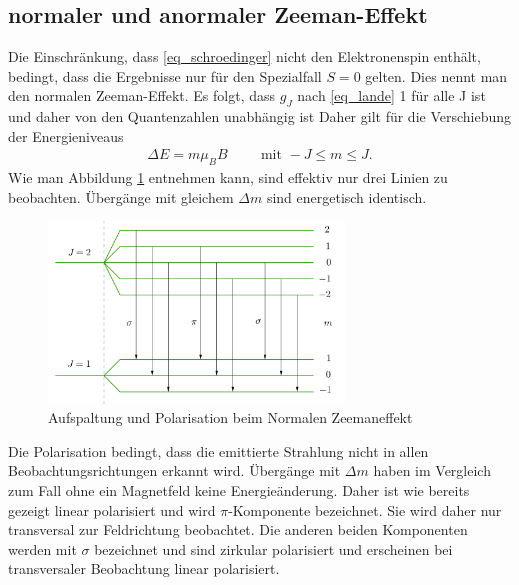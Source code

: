 \subsection{normaler und anormaler Zeeman-Effekt}                  
Die Einschränkung, dass \eqref{eq_schroedinger} nicht den Elektronenspin enthält, bedingt, dass die Ergebnisse nur für den Spezialfall $S=0$ gelten.
Dies nennt man den normalen Zeeman-Effekt. Es folgt, dass $g_J$ nach \eqref{eq_lande} 1 für alle J ist und daher von den Quantenzahlen unabhängig ist
Daher gilt für die Verschiebung der Energieniveaus
\begin{align}
 \Delta E = m \mu_B B \hspace{1cm} \text{mit } -J \leq m \leq J.
\end{align}
Wie man Abbildung \ref{pic_norZee} entnehmen kann, sind effektiv nur drei Linien zu beobachten. Übergänge mit gleichem $\Delta m$ sind energetisch
identisch.
\begin{figure}[H]
\includegraphics[width=0.7\textwidth]{../pics/norZee.png}
\caption{Aufspaltung und Polarisation beim Normalen Zeemaneffekt}
\label{pic_norZee}
\end{figure}
Die Polarisation bedingt, dass die emittierte Strahlung nicht in allen Beobachtungsrichtungen erkannt wird. Übergänge mit $\Delta m$ haben im Vergleich
zum Fall ohne ein Magnetfeld keine Energieänderung. Daher ist wie bereits gezeigt linear polarisiert und wird $\pi$-Komponente bezeichnet. Sie wird
daher nur transversal zur Feldrichtung beobachtet. Die anderen beiden Komponenten werden mit $\sigma$ bezeichnet und sind zirkular polarisiert und 
erscheinen bei transversaler Beobachtung linear polarisiert.

